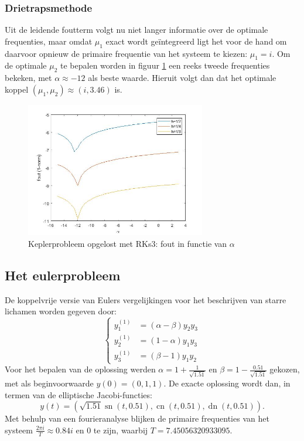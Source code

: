 \documentclass[12pt]{article}
\DeclareMathOperator{\sn}{sn}
\DeclareMathOperator{\cn}{cn}
\DeclareMathOperator{\dn}{dn}
\begin{document}
\subsubsection{Drietrapsmethode}
Uit de leidende foutterm volgt nu niet langer informatie over de optimale frequenties, maar omdat \(\mu_1\) exact wordt geïntegreerd ligt het voor de hand om daarvoor opnieuw de primaire frequentie van het systeem te kiezen: \(\mu_1=i\). Om de optimale \(\mu_2\) te bepalen worden in figuur \ref{fig:kepleralphasrks3} een reeks tweede frequenties bekeken, met \(\alpha\approx-12\) als beste waarde. Hieruit volgt dan dat het optimale koppel \((\mu_1,\mu_2)\approx(i,3.46)\) is.
\begin{figure}[H]
    \centering
    \includegraphics[width=0.7\textwidth]{kepler_RKs3_fixed.jpg}
    \caption{Keplerprobleem opgelost met RKs3: fout in functie van \(\alpha\)}
    \label{fig:kepleralphasrks3}
\end{figure}

\subsection{Het eulerprobleem}
De koppelvrije versie van Eulers vergelijkingen voor het beschrijven van starre lichamen worden gegeven door:
\begin{equation} \label{eq:eulersys}
    \begin{cases}
        y_1^{(1)}&=(\alpha-\beta)y_2y_3 \\
        y_2^{(1)}&=(1-\alpha)y_1y_3 \\
        y_3^{(1)}&=(\beta-1)y_1y_2
    \end{cases}
\end{equation}
Voor het bepalen van de oplossing werden \(\alpha=1+\frac{1}{\sqrt{1.51}}\) en \(\beta=1-\frac{0.51}{\sqrt{1.51}}\) gekozen, met als beginvoorwaarde \(y(0)=(0,1,1)\). De exacte oplossing wordt dan, in termen van de elliptische Jacobi-functies: 
\[y(t)=(\sqrt{1.51}\sn(t,0.51),\cn(t,0.51),\dn(t,0.51)).\]
Met behulp van een fourieranalyse blijken de primaire frequenties van het systeem \(\frac{2\pi i}{T}\approx0.84i\) en 0 te zijn, waarbij \(T=7.45056320933095\).
\end{document}
